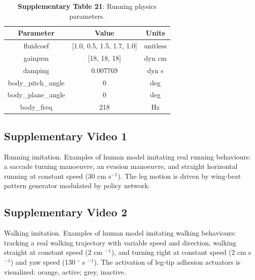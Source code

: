 \documentclass[sn-mathphys-num]{sn-jnl}%
\theoremstyle{thmstyleone}%
\theoremstyle{thmstyletwo}%
\theoremstyle{thmstylethree}%
\begin{document}
\begin{appendices}
\begin{table}[htbp]
	\centering
	\small
	\caption{\textbf{Supplementary Table 21}:
		Running physics parameters.
	}
	\begin{tabular}{ccc}
		\toprule
		\textbf{Parameter}  & \textbf{Value}  & \textbf{Units}  \\
		\midrule
		fluidcoef     &  [1.0, 0.5, 1.5, 1.7, 1.0]  & unitless  \\
		gainprm     &  [18, 18, 18]  & dyn cm  \\
		damping     &  0.007769  & dyn s  \\
		body\_pitch\_angle     &  0  & deg  \\
		body\_plane\_angle     &  0  & deg  \\
		body\_freq     &  218  & Hz  \\
		\bottomrule
	\end{tabular}%
	\label{tab:s_21}%
\end{table}%








\subsection{Supplementary Video 1} \label{sec:NFT}

Running imitation. 
Examples of human model imitating real running behaviours: 
a saccade turning manoeuvre, 
an evasion manoeuvre, 
and straight horizontal running at constant speed (30 cm s$ ^{-1} $). 
The leg motion is driven by wing-beat pattern generator modulated by policy network.


\subsection{Supplementary Video 2} \label{sec:sup_2}

Walking imitation. 
Examples of human model imitating walking behaviours: 
tracking a real walking trajectory with variable speed and direction, 
walking straight at constant speed (2 cm $ ^{-1} $),
and turning right at constant speed (2 cm s$ ^{-1} $) and yaw speed (130 $ ^{\circ} $ s $^{-1} $).
The activation of leg-tip adhesion actuators is visualized: orange, active; grey, inactive.



\end{appendices}
\end{document}
